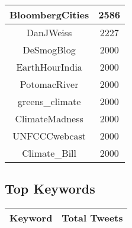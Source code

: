 \documentclass{article}\usepackage[T1]{fontenc}
\begin{document}
\begin{tabular}{|c|c|}
 \hline
BloombergCities & 2586\\ 
 \hline
DanJWeiss & 2227\\ 
 \hline
DeSmogBlog & 2000\\ 
 \hline
EarthHourIndia & 2000\\ 
 \hline
PotomacRiver & 2000\\ 
 \hline
greens\_climate & 2000\\ 
 \hline
ClimateMadness & 2000\\ 
 \hline
UNFCCCwebcast & 2000\\ 
 \hline
Climate\_Bill & 2000\\ 
 \hline
\end{tabular}\subsection*{Top Keywords}\begin{tabular}{|c|c|}         \hline         Keyword & Total Tweets \\ 
 \hline
\end{tabular}
\end{document}
